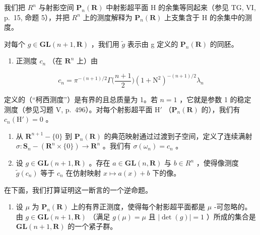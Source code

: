 我们把 \(R^{n}\) 与射影空间 \(\mathbf{P}_{n}(\mathbf{R})\) 中射影超平面 H 的余集等同起来（参见 TG, VI, p.~15, 命题 5），并把 \(R^{n}\) 上的测度解释为 \(\mathbf{P}_{n}(\mathbf{R})\) 上支集含于 H 的余集中的测度。

对每个 \(g \in \mathbf{GL}(n+1, \mathbf{R})\) ，我们用 \(\widetilde{g}\) 表示由 g 定义的 \(\mathbf{P}_{n}(\mathbf{R})\) 的同胚。

\begin{enumerate}
\def\labelenumi{\alph{enumi})}
\tightlist
\item
  正测度 \(c_{n}\) （在 \(\mathbf{R}^n\) 上）由
\end{enumerate}

\[
c _ {n} = \pi^ {- (n + 1) / 2} \Gamma \Big (\frac {n + 1}{2} \Big) (1 + \mathrm{N} ^ {2}) ^ {- (n + 1) / 2} \lambda_ {n}
\]

定义的（“柯西测度”）是有界的且总质量为 1。若 \(n = 1\) ，它就是参数 1 的稳定测度（参见习题 V, p.~496）。对每个射影超平面 \(\mathrm{H}'\) （\(\mathbf{P}_n(\mathbf{R})\) 的），我们有 \(c_n(\mathrm{H}') = 0\) 。

\begin{enumerate}
\def\labelenumi{\alph{enumi})}
\setcounter{enumi}{1}
\item
  从 \(\mathbf{R}^{n+1} - \{0\}\) 到 \(\mathbf{P}_n(\mathbf{R})\) 的典范映射通过过渡到子空间，定义了连续满射 \(\sigma: \mathbf{S}_n - (\mathbf{R}^n \times \{0\}) \to \mathbf{R}^n\) 。我们有 \(\sigma(\omega_n) = c_n\) 。
\item
  设 \(g \in \mathbf{GL}(n+1, \mathbf{R})\) 。存在 \(a \in \mathbf{GL}(n, \mathbf{R})\) 与 \(b \in R^n\) ，使得像测度 \(\widetilde{g}(c_n)\) 等于 \(c_n\) 在仿射映射 \(x \mapsto a(x) + b\) 下的像。
\end{enumerate}

在下面，我们打算证明这一断言的一个逆命题。

\begin{enumerate}
\def\labelenumi{\alph{enumi})}
\setcounter{enumi}{3}
\tightlist
\item
  设 \(\mu\) 为 \(\mathbf{P}_{n}(\mathbf{R})\) 上的有界正测度，使得每个射影超平面都是 \(\mu\) -可忽略的。由 \(g \in \mathbf{GL}(n+1, \mathbf{R})\) （满足 \(g(\mu) = \mu\) 且 \(|\det(g)| = 1\) ）所成的集合是 \(\mathbf{GL}(n+1, \mathbf{R})\) 的一个紧子群。

\end{enumerate}

